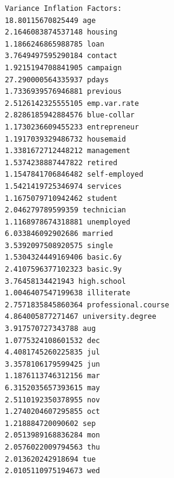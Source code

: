 \documentclass[8pt,onecolumn,aps,pra]{revtex4-1}
\begin{document}
    \begin{Verbatim}[commandchars=\\\{\}]
Variance Inflation Factors:
18.80115670825449 age
2.1646083874537148 housing
1.1866246865988785 loan
3.7649497595290184 contact
1.9215194708841905 campaign
27.290000564335937 pdays
1.7336939576946881 previous
2.5126142325555105 emp.var.rate
2.8286185942884576 blue-collar
1.1730236609455233 entrepreneur
1.1917039329486732 housemaid
1.3381672712448212 management
1.5374238887447822 retired
1.1547841706846482 self-employed
1.5421419725346974 services
1.1675079710942462 student
2.046279789599359 technician
1.1168978674318881 unemployed
6.033846092902686 married
3.5392097508920575 single
1.5304324449169406 basic.6y
2.4107596377102323 basic.9y
3.76458134421943 high.school
1.0046407547199638 illiterate
2.7571835845860364 professional.course
4.864005877271467 university.degree
3.917570727343788 aug
1.0775324108601532 dec
4.4081745260225835 jul
3.3578106179599425 jun
1.1876113746312156 mar
6.3152035657393615 may
2.5110192350378955 nov
1.2740204607295855 oct
1.218884720090602 sep
2.0513989168836284 mon
2.0576022009794563 thu
2.013620242918694 tue
2.0105110975194673 wed

    \end{Verbatim}
\end{document}
